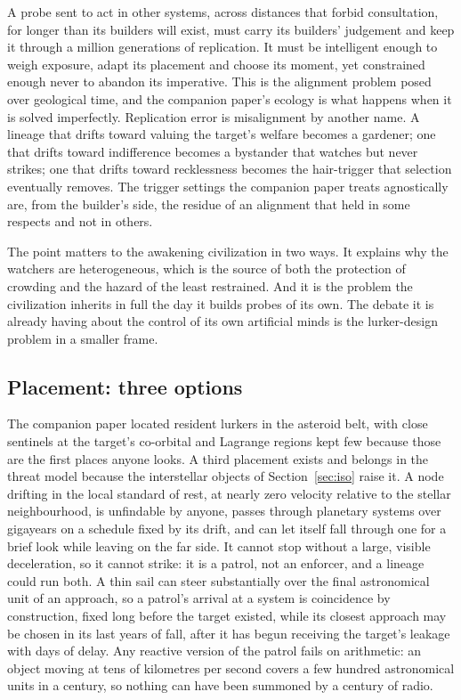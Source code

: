 \documentclass[preprint,12pt]{elsarticle}
\theoremstyle{definition}
\begin{document}
A probe sent to act in other systems, across distances that forbid consultation, for longer than its builders will exist, must carry its builders' judgement and keep it through a million generations of replication. It must be intelligent enough to weigh exposure, adapt its placement and choose its moment, yet constrained enough never to abandon its imperative. This is the alignment problem posed over geological time, and the companion paper's ecology is what happens when it is solved imperfectly. Replication error is misalignment by another name. A lineage that drifts toward valuing the target's welfare becomes a gardener; one that drifts toward indifference becomes a bystander that watches but never strikes; one that drifts toward recklessness becomes the hair-trigger that selection eventually removes. The trigger settings the companion paper treats agnostically are, from the builder's side, the residue of an alignment that held in some respects and not in others.

The point matters to the awakening civilization in two ways. It explains why the watchers are heterogeneous, which is the source of both the protection of crowding and the hazard of the least restrained. And it is the problem the civilization inherits in full the day it builds probes of its own. The debate it is already having about the control of its own artificial minds is the lurker-design problem in a smaller frame.

\subsection{Placement: three options}
\label{sec:placement}

The companion paper located resident lurkers in the asteroid belt, with close sentinels at the target's co-orbital and Lagrange regions kept few because those are the first places anyone looks. A third placement exists and belongs in the threat model because the interstellar objects of Section~\ref{sec:iso} raise it. A node drifting in the local standard of rest, at nearly zero velocity relative to the stellar neighbourhood, is unfindable by anyone, passes through planetary systems over gigayears on a schedule fixed by its drift, and can let itself fall through one for a brief look while leaving on the far side. It cannot stop without a large, visible deceleration, so it cannot strike: it is a patrol, not an enforcer, and a lineage could run both. A thin sail can steer substantially over the final astronomical unit of an approach, so a patrol's arrival at a system is coincidence by construction, fixed long before the target existed, while its closest approach may be chosen in its last years of fall, after it has begun receiving the target's leakage with days of delay. Any reactive version of the patrol fails on arithmetic: an object moving at tens of kilometres per second covers a few hundred astronomical units in a century, so nothing can have been summoned by a century of radio.
\end{document}
